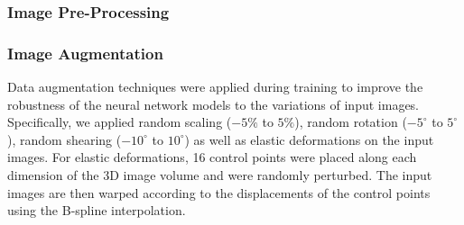 \documentclass[times,review,preprint,authoryear]{elsarticle}
\begin{document}
\subsubsection{Image Pre-Processing}
\label{appendix:pre-processing}

\subsubsection{Image Augmentation} Data augmentation techniques were applied during training to improve the robustness of the neural network models to the variations of input images. Specifically, we applied random scaling ($-5\%$ to $5\%$), random rotation ($-5^{\circ}$ to $5^{\circ}$), random shearing ($-10^{\circ}$ to $10^{\circ}$) as well as elastic deformations \citep{Simard2003BestPF} on the input images. For elastic deformations, 16 control points were placed along each dimension of the 3D image volume and were randomly perturbed. The input images are then warped according to the displacements of the control points using the B-spline interpolation. 
\end{document}
